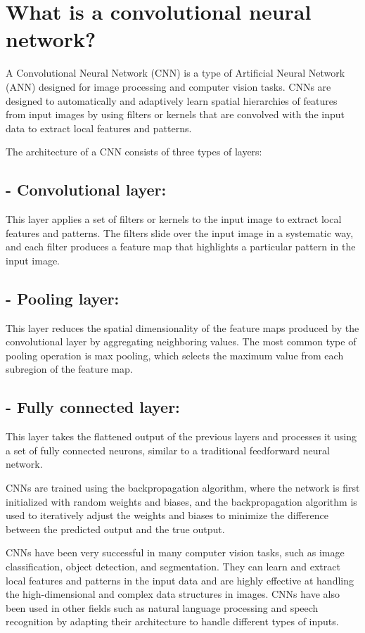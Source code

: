 \section{What is a convolutional neural network?}
A Convolutional Neural Network (CNN) is a type of Artificial Neural Network (ANN) designed for image processing and computer vision tasks. CNNs are designed to automatically and adaptively learn spatial hierarchies of features from input images by using filters or kernels that are convolved with the input data to extract local features and patterns.

The architecture of a CNN consists of three types of layers:

\subsection{- Convolutional layer:}  This layer applies a set of filters or kernels to the input image to extract local features and patterns. The filters slide over the input image in a systematic way, and each filter produces a feature map that highlights a particular pattern in the input image.

\subsection{- Pooling layer:}  This layer reduces the spatial dimensionality of the feature maps produced by the convolutional layer by aggregating neighboring values. The most common type of pooling operation is max pooling, which selects the maximum value from each subregion of the feature map.

\subsection{- Fully connected layer:}  This layer takes the flattened output of the previous layers and processes it using a set of fully connected neurons, similar to a traditional feedforward neural network.

CNNs are trained using the backpropagation algorithm, where the network is first initialized with random weights and biases, and the backpropagation algorithm is used to iteratively adjust the weights and biases to minimize the difference between the predicted output and the true output.

CNNs have been very successful in many computer vision tasks, such as image classification, object detection, and segmentation. They can learn and extract local features and patterns in the input data and are highly effective at handling the high-dimensional and complex data structures in images. CNNs have also been used in other fields such as natural language processing and speech recognition by adapting their architecture to handle different types of inputs.

